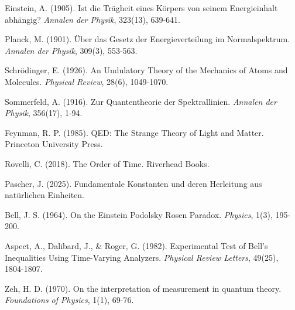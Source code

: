 \documentclass{article}
\begin{document}
	\begin{thebibliography}{9}
		
		 Einstein, A. (1905). Ist die Trägheit eines Körpers von seinem Energieinhalt abhängig? \textit{Annalen der Physik}, 323(13), 639-641.
		
		 Planck, M. (1901). Über das Gesetz der Energieverteilung im Normalspektrum. \textit{Annalen der Physik}, 309(3), 553-563.
		
		 Schrödinger, E. (1926). An Undulatory Theory of the Mechanics of Atoms and Molecules. \textit{Physical Review}, 28(6), 1049-1070.
		
		 Sommerfeld, A. (1916). Zur Quantentheorie der Spektrallinien. \textit{Annalen der Physik}, 356(17), 1-94.
		
		 Feynman, R. P. (1985). QED: The Strange Theory of Light and Matter. Princeton University Press.
		
		 Rovelli, C. (2018). The Order of Time. Riverhead Books.
		
		 Pascher, J. (2025). Fundamentale Konstanten und deren Herleitung aus natürlichen Einheiten.
		
		 Bell, J. S. (1964). On the Einstein Podolsky Rosen Paradox. \textit{Physics}, 1(3), 195-200.
		
		 Aspect, A., Dalibard, J., \& Roger, G. (1982). Experimental Test of Bell's Inequalities Using Time-Varying Analyzers. \textit{Physical Review Letters}, 49(25), 1804-1807.
		
		 Zeh, H. D. (1970). On the interpretation of measurement in quantum theory. \textit{Foundations of Physics}, 1(1), 69-76.
		
	\end{thebibliography}
	
\end{document}
